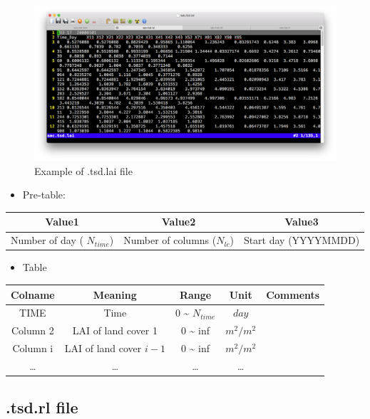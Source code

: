 \documentclass[
]{scrbook}
\providecommand{\tightlist}{%
  \setlength{\itemsep}{0pt}\setlength{\parskip}{0pt}}
\begin{document}
\begin{figure}
\centering
\includegraphics{Fig/IO/tsd.lai.png}
\caption{Example of .tsd.lai file}
\end{figure}

\begin{itemize}
\tightlist
\item
  Pre-table:
\end{itemize}

\begin{longtable}[]{@{}ccc@{}}
\toprule
Value1 & Value2 & Value3\tabularnewline
\midrule
\endhead
Number of day ( \(N_{time}\)) & Number of columns (\(N_{lc}\)) & Start day (YYYYMMDD)\tabularnewline
\bottomrule
\end{longtable}

\begin{itemize}
\tightlist
\item
  Table
\end{itemize}

\begin{longtable}[]{@{}ccccc@{}}
\toprule
Colname & Meaning & Range & Unit & Comments\tabularnewline
\midrule
\endhead
TIME & Time & 0 \textasciitilde{} \(N_{time}\) & \(day\) &\tabularnewline
Column 2 & LAI of land cover 1 & 0 \textasciitilde{} inf & \(m^2/m^2\) &\tabularnewline
Column i & LAI of land cover \(i-1\) & 0 \textasciitilde{} inf & \(m^2/m^2\) &\tabularnewline
\ldots{} & \ldots{} & \ldots{} & \ldots{} &\tabularnewline
\bottomrule
\end{longtable}

\hypertarget{tsd.rl-file}{%
\subsection{.tsd.rl file}\label{tsd.rl-file}}
\end{document}
